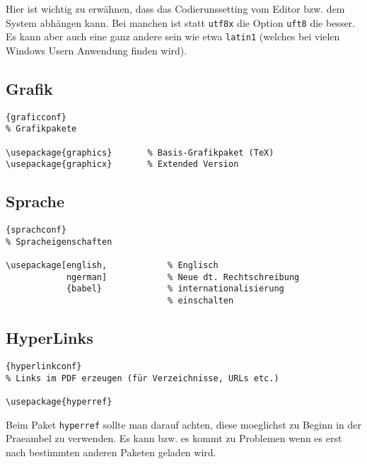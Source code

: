 \noindent
Hier ist wichtig zu erwähnen, dass das Codierunssetting vom
Editor bzw. dem System abhängen kann. Bei manchen ist statt
\lstinline|utf8x| die Option \lstinline|uft8| die besser.
Es kann aber auch eine ganz andere sein wie etwa
\lstinline|latin1| (welches bei vielen Windows Usern
Anwendung finden wird).

\subsection{Grafik}

\begin{center}
\begin{lstlisting}[caption=Grafik]{graficconf}
% Grafikpakete

\usepackage{graphics}       % Basis-Grafikpaket (TeX)
\usepackage{graphicx}       % Extended Version
\end{lstlisting}
\end{center}

\subsection{Sprache}

\begin{center}
\begin{lstlisting}[caption=Spracheigenschaften]{sprachconf}
% Spracheigenschaften

\usepackage[english,            % Englisch
            ngerman]            % Neue dt. Rechtschreibung
            {babel}             % internationalisierung
                                % einschalten
\end{lstlisting}
\end{center}

\subsection{HyperLinks}

\begin{center}
\begin{lstlisting}[caption=Dynamische Links]{hyperlinkconf}
% Links im PDF erzeugen (für Verzeichnisse, URLs etc.)

\usepackage{hyperref}
\end{lstlisting}
\end{center}

\noindent
Beim Paket \lstinline|hyperref| sollte man darauf achten,
diese moeglichst zu Beginn in der Praeambel zu verwenden.
Es kann bzw. es kommt zu Problemen wenn es erst nach
bestimmten anderen Paketen geladen wird.

